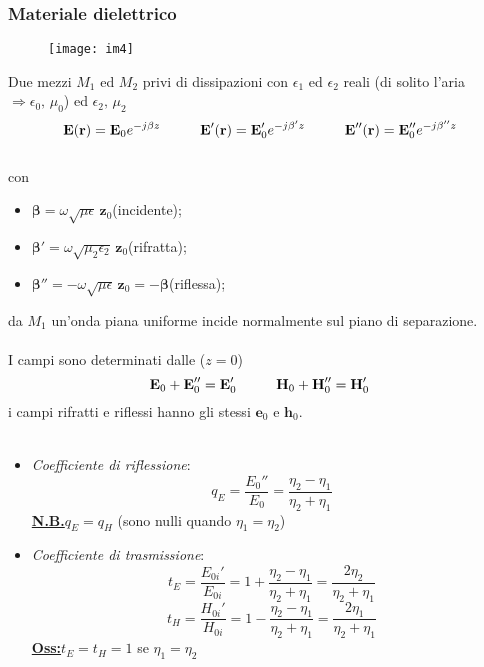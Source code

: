 \documentclass[a4paper]{article}
\begin{document}
\subsubsection*{Materiale dielettrico}
\begin{figure}[ht] 
\centering
\texttt{[image: im4]}
\end{figure}
Due mezzi $M_1$ ed $M_2$ privi di dissipazioni con $\epsilon_1$ ed $\epsilon_2$ reali (di solito l'aria $\Rightarrow\epsilon_0,\,\mu_0$) ed $\epsilon_2,\,\mu_2$
\begin{equation*}
\textbf{E}(\textbf{r})=\textbf{E}_0e^{-j\beta z}\hspace{10mm}\textbf{E}'(\textbf{r})=\textbf{E}_0'e^{-j\beta'z}\hspace{10mm}\textbf{E}''(\textbf{r})=\textbf{E}_0''e^{-j\beta''z}
\end{equation*}
\\con
\begin{itemize}
\item $\bm{\beta}=\omega\sqrt{\mu\epsilon}\,\textbf{z}_0$\hspace{29mm}(incidente);
\item $\bm{\beta}'=\omega\sqrt{\mu_2\epsilon_2}\,\textbf{z}_0$\hspace{25mm}(rifratta);
\item $\bm{\beta}''=-\omega\sqrt{\mu\epsilon}\,\textbf{z}_0=-\bm{\beta}$\hspace{15mm}(riflessa);
\end{itemize}
da $M_1$ un'onda piana uniforme incide normalmente sul piano di separazione.\\\\
I campi sono determinati dalle ($z=0$)
\begin{equation*}
\textbf{E}_0+\textbf{E}_0''=\textbf{E}_0'\hspace{10mm}\textbf{H}_0+\textbf{H}_0''=\textbf{H}_0'
\end{equation*}
i campi rifratti e riflessi hanno gli stessi $\textbf{e}_0$ e $\textbf{h}_0$.\\\\
\begin{itemize}
\item \emph{Coefficiente di riflessione}:
\begin{equation*}
q_E=\frac{E_0''}{E_0}=\frac{\eta_2-\eta_1}{\eta_2+\eta_1}
\end{equation*}
\underline{\textbf{N.B.}}\hspace{5mm}$q_E=q_H$ (sono nulli quando $\eta_1=\eta_2$)
\item \emph{Coefficiente di trasmissione}:
\begin{equation*}
t_E=\frac{E_{0i}'}{E_{0i}}=1+\frac{\eta_2-\eta_1}{\eta_2+\eta_1}=\frac{2\eta_2}{\eta_2+\eta_1}
\end{equation*}
\begin{equation*}
t_H=\frac{H_{0i}'}{H_{0i}}=1-\frac{\eta_2-\eta_1}{\eta_2+\eta_1}=\frac{2\eta_1}{\eta_2+\eta_1}
\end{equation*}
\underline{\textbf{Oss:}}\hspace{5mm}$t_E=t_H=1$ se $\eta_1=\eta_2$
\end{itemize}

\end{document}
